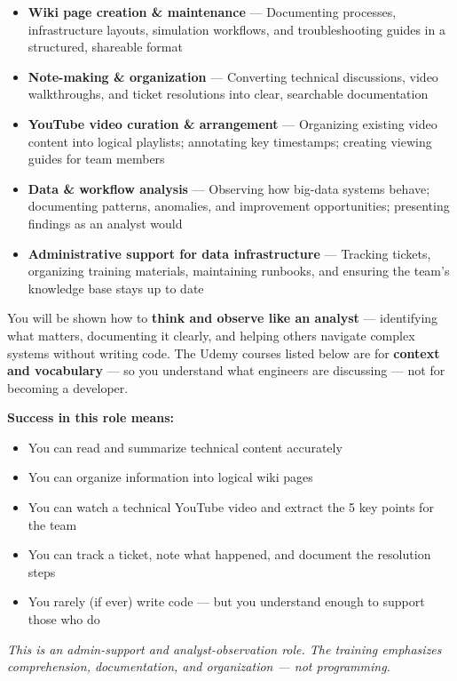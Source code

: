 \documentclass[12pt]{article}
\begin{document}
	\begin{itemize}
		\item \textbf{Wiki page creation \& maintenance} — Documenting processes, infrastructure layouts, simulation workflows, and troubleshooting guides in a structured, shareable format
		\item \textbf{Note-making \& organization} — Converting technical discussions, video walkthroughs, and ticket resolutions into clear, searchable documentation
		\item \textbf{YouTube video curation \& arrangement} — Organizing existing video content into logical playlists; annotating key timestamps; creating viewing guides for team members
		\item \textbf{Data \& workflow analysis} — Observing how big-data systems behave; documenting patterns, anomalies, and improvement opportunities; presenting findings as an analyst would
		\item \textbf{Administrative support for data infrastructure} — Tracking tickets, organizing training materials, maintaining runbooks, and ensuring the team's knowledge base stays up to date
	\end{itemize}
	
	You will be shown how to \textbf{think and observe like an analyst} — identifying what matters, documenting it clearly, and helping others navigate complex systems without writing code. The Udemy courses listed below are for \textbf{context and vocabulary} — so you understand what engineers are discussing — not for becoming a developer.
	
	\textbf{Success in this role means:}
	\begin{itemize}
		\item You can read and summarize technical content accurately
		\item You can organize information into logical wiki pages
		\item You can watch a technical YouTube video and extract the 5 key points for the team
		\item You can track a ticket, note what happened, and document the resolution steps
		\item You rarely (if ever) write code — but you understand enough to support those who do
	\end{itemize}
	
	\textit{This is an admin-support and analyst-observation role. The training emphasizes comprehension, documentation, and organization — not programming.}
	
\end{document}
